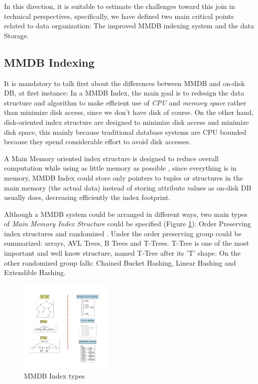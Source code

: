 \documentclass[12pt]{article} %
\begin{document}
    In this direction, it is suitable to estimate the challenges toward this join in technical perspectives, specifically, we have defined two main critical points related to data organization: The improved MMDB indexing system and the data Storage.

    
\subsection{MMDB Indexing}
It is mandatory to talk first about the differences between MMDB and on-disk DB, at first instance: In a MMDB Index, the main goal is to redesign the data structure and algorithm to make efficient use of \emph{ CPU } and \emph{ memory space } rather than minimize disk access, since we don't have disk of course. On the other hand, disk-oriented index structure are designed to minimize disk access and minimize disk space, this mainly because traditional database systems are CPU bounded because they spend considerable effort to avoid disk accesses.

A Main Memory oriented index structure is designed to reduce overall computation while using as little memory as possible \cite{lehman1986study}, since everything is in memory, MMDB Index could store only pointers to tuples or structures in the main memory (the actual data) instead of storing attribute values as on-disk DB usually does, decreasing efficiently the index footprint.

Although a MMDB system could be arranged in different ways, two main types of \emph{ Main Memory Index Structure } could be specified (Figure \ref{fig:fig6}): Order Preserving index structures and randomized \cite{lehman1986study}. Under the order preserving group could be summarized: arrays, AVL Trees, B Trees and T-Trees. T-Tree is one of the most important and well know structure, named T-Tree after its 'T' shape. On the other randomized group falls: Chained Bucket Hashing, Linear Hashing and Extendible Hashing.

\begin{figure}
  \vspace{-20pt}
    \centering
    \includegraphics[width=0.4\textwidth]{./pictures/fig6}
  \caption{MMDB Index types}
  \label{fig:fig6}
  \vspace{-20pt}
\end{figure}
\end{document}
